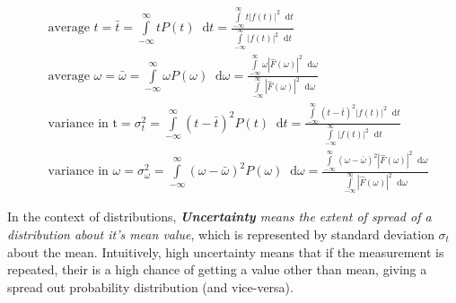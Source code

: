 \documentclass[11pt, a4paper]{article}
\newcommand{\variance}[1]{\sigma_{#1}^{2}}
\newcommand{\stdev}[1]{\sigma_{#1}}
\newcommand{\diff}{\mathop{}\!\mathrm{d}}
\newcommand{\dt}{\diff t}
\newcommand{\domega}{\diff \omega}
\newcommand{\dint}[2]{\int \limits_{#1}^{#2}}  %
\newcommand{\intinfty}{\dint{-\infty}{\infty}}	%
\begin{document}
\begin{subequations}
	\begin{align}
		& \text{average } t = \bar{t} = \intinfty t P(t) \dt = \frac{\intinfty t |f(t)|^{2} \dt}{\intinfty |f(t)|^{2} \dt} \label{eq:avg_t} \\
		& \text{average } \omega = \bar{\omega} = \intinfty \omega P(\omega) \domega = \frac{\intinfty \omega |\hat{F}(\omega)|^{2} \domega}{\intinfty |\hat{F}(\omega)|^{2} \domega} \label{eq:avg_omega} \\
		& \text{variance in t} = \variance{t} = \intinfty (t - \bar{t})^{2} P(t) \dt = \frac{\intinfty (t - \bar{t})^{2} |f(t)|^{2} \dt}{\intinfty |f(t)|^{2} \dt} \label{eq:variance_t} \\
		& \text{variance in $\omega$} = \variance{\omega} = \intinfty (\omega - \bar{\omega})^{2} P(\omega) \domega = \frac{\intinfty (\omega - \bar{\omega})^{2} |\hat{F}(\omega)|^{2} \domega}{\intinfty |\hat{F}(\omega)|^{2} \domega} \label{eq:variance_omega}
	\end{align}
\end{subequations}

In the context of distributions, \textit{\textbf{Uncertainty} means the extent of spread of a distribution about it's mean value}, which is represented by standard deviation $\stdev{t}$ about the mean. Intuitively, high uncertainty means that if the measurement is repeated, their is a high chance of getting a value other than mean, giving a spread out probability distribution (and vice-versa).
\end{document}
